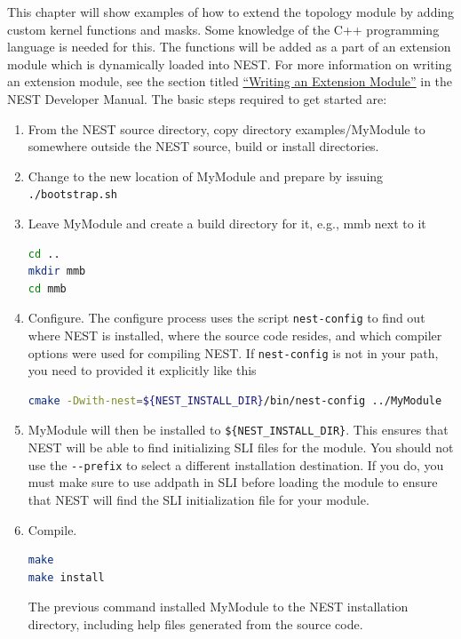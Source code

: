 \documentclass[a4paper,12pt]{report}
\begin{document}
This chapter will show examples of how to extend the topology module by
adding custom kernel functions and masks. Some knowledge of the C++
programming language is needed for this. The functions will be added as a
part of an extension module which is dynamically loaded into NEST. For more
information on writing an extension module, see the section titled
\href{http://nest.github.io/nest-simulator/extension_modules}{``Writing an Extension Module''}
in the NEST Developer Manual. The basic steps required to get started are:
\begin{enumerate}
\item From the NEST source directory, copy directory examples/MyModule to
  somewhere outside the NEST source, build or install directories.
\item Change to the new location of MyModule and prepare by issuing
  \lstinline!./bootstrap.sh!
\item Leave MyModule and create a build directory for it, e.g., mmb next to
  it
\begin{lstlisting}[language=bash]
cd ..
mkdir mmb
cd mmb
\end{lstlisting}
\item Configure. The configure process uses the script \lstinline!nest-config!
  to find out where NEST is installed, where the source code resides, and
  which compiler options were used for compiling NEST. If
  \lstinline!nest-config! is not in your path, you need to provided it
  explicitly like this
\begin{lstlisting}[language=bash]
cmake -Dwith-nest=${NEST_INSTALL_DIR}/bin/nest-config ../MyModule
\end{lstlisting}
\item MyModule will then be installed to \lstinline!${NEST_INSTALL_DIR}!. This
  ensures that NEST will be able to find initializing SLI files for the
  module.  You should not use the \lstinline!--prefix! to select a different
  installation destination. If you do, you must make sure to use addpath in
  SLI before loading the module to ensure that NEST will find the SLI
  initialization file for your module.
\item Compile.
\begin{lstlisting}[language=bash]
make
make install
\end{lstlisting}
The previous command installed MyModule to the NEST installation directory, including help files generated from the source code.
\end{enumerate}
\end{document}
